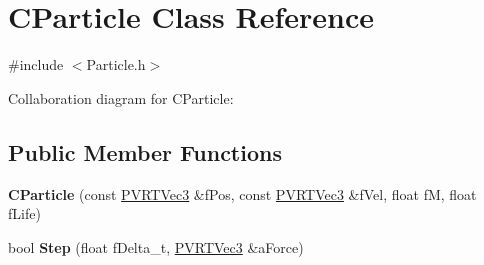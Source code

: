 \hypertarget{class_c_particle}{\section{C\+Particle Class Reference}
\label{class_c_particle}
}


{\ttfamily \#include $<$Particle.\+h$>$}



Collaboration diagram for C\+Particle\+:
\subsection*{Public Member Functions}
\begin{DoxyCompactItemize}
\item 
\hypertarget{class_c_particle_a4709f034c8664eaacc4858f57106d4dd}{{\bfseries C\+Particle} (const \hyperlink{struct_p_v_r_t_vec3}{P\+V\+R\+T\+Vec3} \&f\+Pos, const \hyperlink{struct_p_v_r_t_vec3}{P\+V\+R\+T\+Vec3} \&f\+Vel, float f\+M, float f\+Life)}\label{class_c_particle_a4709f034c8664eaacc4858f57106d4dd}

\item 
\hypertarget{class_c_particle_a2806dfe5b58b0a03ac7875eac78446a8}{bool {\bfseries Step} (float f\+Delta\+\_\+t, \hyperlink{struct_p_v_r_t_vec3}{P\+V\+R\+T\+Vec3} \&a\+Force)}\label{class_c_particle_a2806dfe5b58b0a03ac7875eac78446a8}

\end{DoxyCompactItemize}
